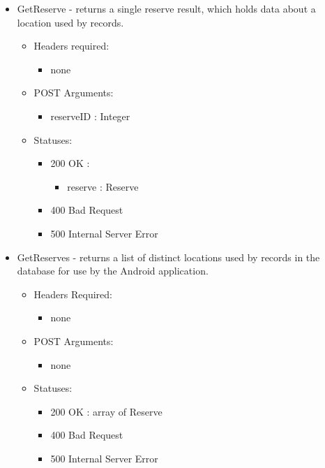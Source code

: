 \begin{itemize}
\begin{itemize}
\begin{itemize}
\begin{itemize}
\begin{itemize}
		\item GetReserve - returns a single reserve result, which holds data about a location used by records. 
        \begin{itemize}
        \item Headers required: 
        \begin{itemize}
            \item none
        \end{itemize}
        \item POST Arguments:
        \begin{itemize}
        	\item reserveID : Integer
        \end{itemize}
        \item Statuses:
        \begin{itemize}
        	\item 200 OK :
            \begin{itemize}
                \item reserve : Reserve
            \end{itemize}
        	\item 400 Bad Request
        	\item 500 Internal Server Error
        \end{itemize}
	    \end{itemize}	    

        \item GetReserves - returns a list of distinct locations used by records in the database for use by the Android application.
        \begin{itemize}
        \item Headers Required:
        \begin{itemize}
              	\item none
        \end{itemize}
        \item POST Arguments:
        \begin{itemize}
              	\item none
        \end{itemize}
        \item Statuses: 
        \begin{itemize}
              	\item 200 OK : array of Reserve
              	\item 400 Bad Request
              	\item 500 Internal Server Error
        \end{itemize}
	    \end{itemize}



\end{itemize}
\end{itemize}
\end{itemize}
\end{itemize}
\end{itemize}
